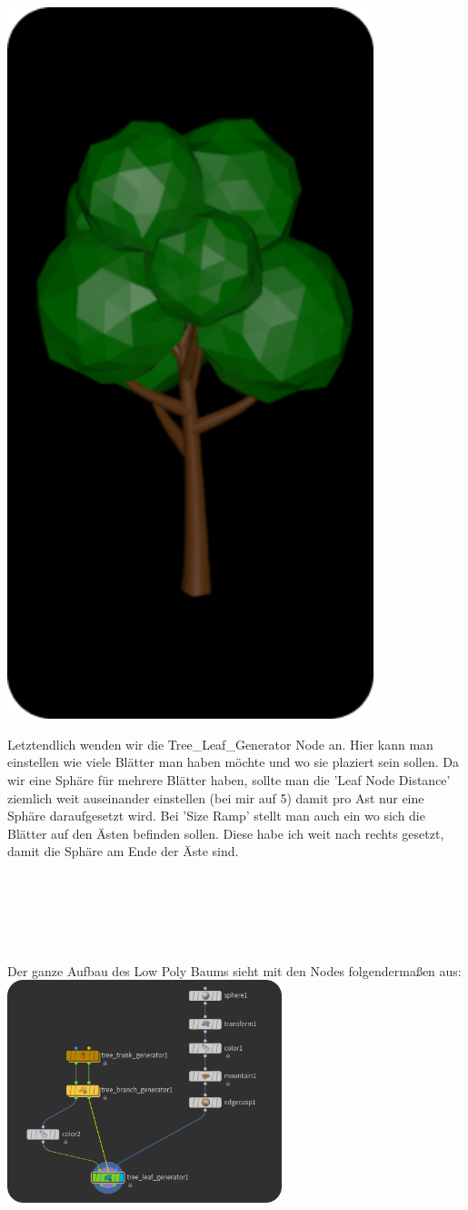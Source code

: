 \documentclass[paper=a4,fontsize=12pt,ngerman]{scrartcl}
\begin{document}
	\begin{minipage}{0.3\textwidth}
		\includegraphics[width=0.8\textwidth]{graphics/Ali10.png}
	\end{minipage}
	\begin{minipage}{0.7\textwidth}
		Letztendlich wenden wir die Tree\_Leaf\_Generator Node an. Hier kann man einstellen wie viele Blätter man haben möchte und wo sie plaziert sein sollen. Da wir eine Sphäre für mehrere Blätter haben, sollte man die 'Leaf Node Distance' ziemlich weit auseinander einstellen (bei mir auf 5) damit pro Ast nur eine Sphäre daraufgesetzt wird. Bei 'Size Ramp' stellt man auch ein wo sich die Blätter auf den Ästen befinden sollen. Diese habe ich weit nach rechts gesetzt, damit die Sphäre am Ende der Äste sind.
	\end{minipage}\\ \\ \\ \\ \\
	Der ganze Aufbau des Low Poly Baums sieht mit den Nodes folgendermaßen aus:\\
	\includegraphics*[width=0.6\textwidth]{graphics/Ali11.png}
\end{document}
